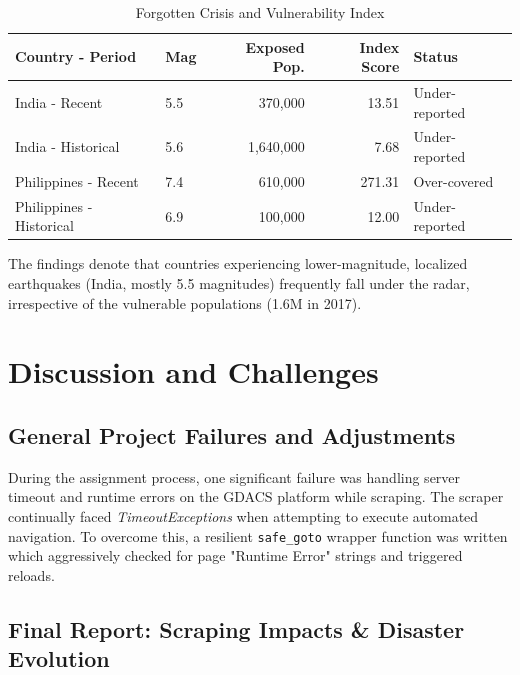 \documentclass[11pt,a4paper]{article}
\begin{document}
\begin{table}[H]
\centering
\caption{Forgotten Crisis and Vulnerability Index}
\begin{tabular}{l l r r l}
\toprule
\textbf{Country - Period} & \textbf{Mag} & \textbf{Exposed Pop.} & \textbf{Index Score} & \textbf{Status}\\
\midrule
India - Recent & 5.5 & 370,000 & 13.51 & Under-reported \\
India - Historical & 5.6 & 1,640,000 & 7.68 & Under-reported \\
Philippines - Recent & 7.4 & 610,000 & 271.31 & Over-covered \\
Philippines - Historical & 6.9 & 100,000 & 12.00 & Under-reported \\
\bottomrule
\end{tabular}
\end{table}

The findings denote that countries experiencing lower-magnitude, localized earthquakes (India, mostly 5.5 magnitudes) frequently fall under the radar, irrespective of the vulnerable populations (1.6M in 2017).

\section{Discussion and Challenges}

\subsection{General Project Failures and Adjustments}
During the assignment process, one significant failure was handling server timeout and runtime errors on the GDACS platform while scraping. The scraper continually faced \textit{TimeoutExceptions} when attempting to execute automated navigation. To overcome this, a resilient \texttt{safe\_goto} wrapper function was written which aggressively checked for page "Runtime Error" strings and triggered reloads.

\subsection{Final Report: Scraping Impacts \& Disaster Evolution}
\end{document}
